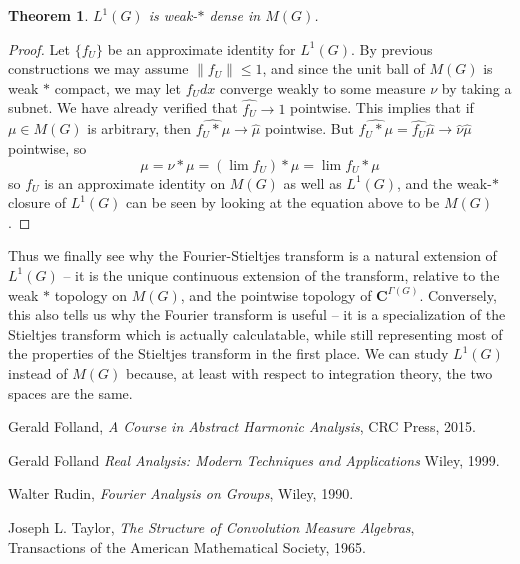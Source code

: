 \documentclass{article}
\theoremstyle{plain}
\newtheorem{theorem}{Theorem}
\theoremstyle{definition}
\begin{document}
\begin{theorem}
    $L^1(G)$ is weak-$*$ dense in $M(G)$.
\end{theorem}
\begin{proof}
    Let $\{ f_U \}$ be an approximate identity for $L^1(G)$. By previous constructions we may assume $\| f_U \| \leq 1$, and since the unit ball of $M(G)$ is weak $*$ compact, we may let $f_U dx$ converge weakly to some measure $\nu$ by taking a subnet. We have already verified that $\widehat{f_U} \to 1$ pointwise. This implies that if $\mu \in M(G)$ is arbitrary, then $\widehat{f_U * \mu} \to \widehat{\mu}$ pointwise. But $\widehat{f_U * \mu} = \widehat{f_U} \widehat{\mu} \to \widehat{\nu} \widehat{\mu}$ pointwise, so
    \[ \mu = \nu * \mu = \left( \lim f_U \right) * \mu = \lim f_U * \mu \]
    so $f_U$ is an approximate identity on $M(G)$ as well as $L^1(G)$, and the weak-$*$ closure of $L^1(G)$ can be seen by looking at the equation above to be $M(G)$.
\end{proof}

Thus we finally see why the Fourier-Stieltjes transform is a natural extension of $L^1(G)$ -- it is the unique continuous extension of the transform, relative to the weak $*$ topology on $M(G)$, and the pointwise topology of $\mathbf{C}^{\Gamma(G)}$. Conversely, this also tells us why the Fourier transform is useful -- it is a specialization of the Stieltjes transform which is actually calculatable, while still representing most of the properties of the Stieltjes transform in the first place. We can study $L^1(G)$ instead of $M(G)$ because, at least with respect to integration theory, the two spaces are the same.

\begin{thebibliography}{9}

    Gerald Folland,
    \emph{A Course in Abstract Harmonic Analysis},
    CRC Press,
    2015.

    Gerald Folland
    \emph{Real Analysis: Modern Techniques and Applications}
    Wiley,
    1999.

    Walter Rudin,
    \emph{Fourier Analysis on Groups},
    Wiley,
    1990.

    Joseph L. Taylor,
    \emph{The Structure of Convolution Measure Algebras},\\
    Transactions of the American Mathematical Society,
    1965.

\end{thebibliography}
\end{document}

